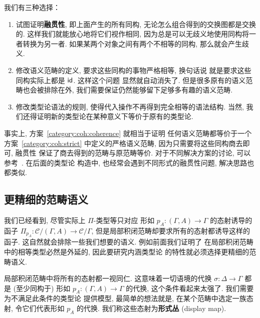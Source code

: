 我们有三种选择：
\begin{enumerate}
\item\label{category:coh:coherence} 试图证明\textbf{融贯性},
即上面产生的所有同构, 无论怎么组合得到的交换图都是交换的.
这样我们就能放心地将它们视作相同,
因为总是可以无歧义地使用同构将一者转换为另一者.
如果某两个对象之间有两个不相等的同构, 那么就会产生歧义.
\item\label{category:coh:strict} 修改语义范畴的定义,
要求这些同构的事物严格相等, 换句话说
就是要求这些同构实际上都是 \(\textnormal{\textsf{id}}\). 这样这个问题
显然就自动消失了. 但是很多原有的语义范畴也会被排除在外,
我们需要保证仍然能够留下足够多有趣的语义范畴.
\item\label{category:coh:weak} 修改类型论语法的规则,
使得代入操作不再得到完全相等的语法结构. 当然,
我们还得证明新的类型论在某种意义下等价于原有的类型论.
\end{enumerate}
事实上, 方案~\ref{category:coh:coherence} 就相当于证明
任何语义范畴都等价于一个方案~\ref{category:coh:strict}
中定义的严格语义范畴, 因为只需要将这些同构商去即可, 融贯性
保证了商去得到的范畴与原范畴等价. 对于不同解决方案的讨论,
可以参考~\cite{curien:2014:revisit}. 在后面的类型论
构造中, 也经常会遇到不同形式的融贯性问题, 解决思路也都类似.

\subsection{更精细的范畴语义}\label{category:better}
我们已经看到, 尽管实际上 \(\Pi\)-类型等只对应
形如 \(p_A : (\Gamma, A) \to \Gamma\) 的态射诱导的
函子 \(\Pi_{p_A} : \mathcal C/(\Gamma, A) \to \mathcal C/\Gamma\),
但是局部积闭范畴却要求所有的态射都诱导这样的函子.
这自然就会排除一些我们想要的语义. 例如前面我们证明了
在局部积闭范畴中的相等类型必然是外延的, 因此要研究内涵类型论
的特性就必须选择更精细的范畴语义.

局部积闭范畴中将所有的态射都一视同仁.
这意味着一切语境的代换 \(\sigma : \Delta \to \Gamma\)
都是 (至少同构于) 形如 \(p_A : (\Gamma, A) \to \Gamma\)
的代换, 这个条件看起来太强了. 我们需要为不满足此条件的类型论
提供模型, 最简单的想法就是, 在某个范畴中选定一族态射,
令它们代表形如 \(p_A\) 的代换.
我们称这些态射为\textbf{形式丛} (display map).

